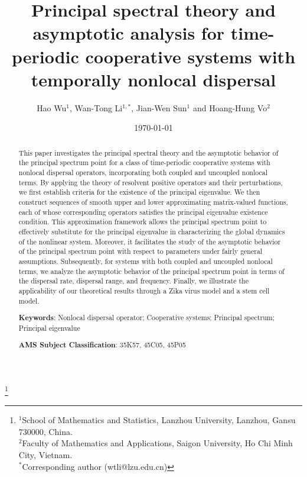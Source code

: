 \documentclass[11pt,reqno]{amsart}
\numberwithin{equation}{section}
\begin{document}
\title[Principal spectral theory and asymptotic analysis]{ Principal spectral theory and asymptotic analysis for time-periodic cooperative systems with temporally nonlocal dispersal}

\author[Wu, Li, Sun and Vo]{Hao Wu$^{1}$, Wan-Tong Li$^{1,*}$, Jian-Wen Sun$^{1}$ and Hoang-Hung Vo$^{2}$}
\thanks{%
$^1$School of Mathematics and Statistics, Lanzhou University, Lanzhou, Gansu 730000, China.\\
$^2$Faculty of Mathematics and Applications, Saigon University, Ho Chi Minh City, Vietnam.\\
$^*${\sf Corresponding author} (wtli@lzu.edu.cn)}
\date{\today}

\begin{abstract}
This paper investigates the principal spectral theory and the asymptotic behavior of the principal spectrum point for a class of time-periodic cooperative systems with nonlocal dispersal operators, incorporating both coupled and uncoupled nonlocal terms. By applying the theory of resolvent positive operators and their perturbations, we first establish criteria for the existence of the principal eigenvalue. We then construct sequences of smooth upper and lower approximating matrix-valued functions, each of whose corresponding operators satisfies the principal eigenvalue existence condition. This approximation framework allows the principal spectrum point to effectively substitute for the principal eigenvalue in characterizing the global dynamics of the nonlinear system. Moreover, it facilitates the study of the asymptotic behavior of the principal spectrum point with respect to parameters under fairly general assumptions. Subsequently, for systems with both coupled and uncoupled nonlocal terms, we analyze the asymptotic behavior of the principal spectrum point in terms of the dispersal rate, dispersal range, and frequency. Finally, we illustrate the applicability of our theoretical results through a Zika virus model and a stem cell model.

\textbf{Keywords}: Nonlocal dispersal operator; Cooperative systems; Principal spectrum; Principal eigenvalue
		
\textbf{AMS Subject Classification}: 35K57, 45C05, 45P05

\end{abstract}

\maketitle
\end{document}
